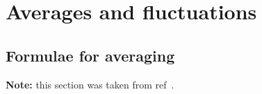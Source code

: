 %
%
%
%
%
%
%

%
%
\chapter{Averages and fluctuations}
\section{Formulae for averaging}
{\bf Note:} this section was taken from ref~\cite{Gunsteren94a}.

